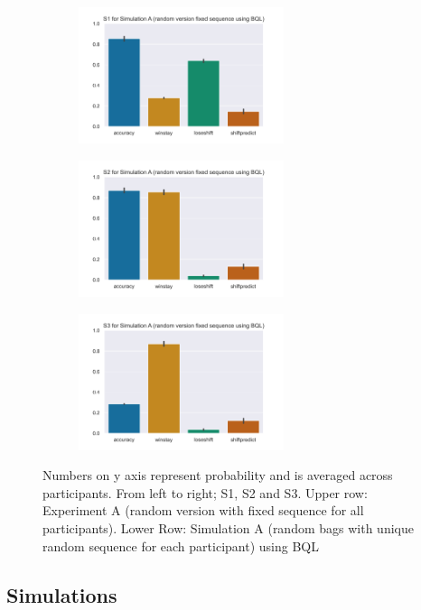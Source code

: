 \documentclass[10pt,letterpaper]{article}
\begin{document}
\begin{figure}[t]
\begin{subfigure}{0.33\textwidth}
\includegraphics[width=0.9\linewidth, height=4cm]{plots/simA_s1.png} 
\label{fig:simA1}
\end{subfigure}
\begin{subfigure}{0.33\textwidth}
\includegraphics[width=0.9\linewidth, height=4cm]{plots/simA_s2.png}
\label{fig:simA2}
\end{subfigure}
\begin{subfigure}{0.33\textwidth}
\includegraphics[width=0.9\linewidth, height=4cm]{plots/simA_s3.png}
\label{fig:simA3}
\end{subfigure}
 
\caption{Numbers on y axis represent probability and is averaged across participants. From left to right; S1, S2 and S3. Upper row: Experiment A (random version with fixed sequence for all participants). Lower Row: Simulation A (random bags with unique random sequence for each participant) using BQL}
\label{fig:figure2}
\end{figure}

\subsection{Simulations}
\end{document}
